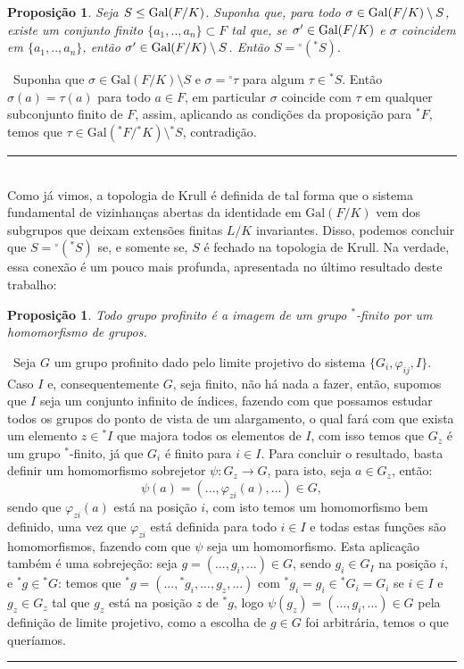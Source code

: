 \documentclass[12pt,a4paper]{article}
\newtheorem{prop}[mydef]{Proposição}
\def\dem{\par\smallbreak\noindent {\textit{ Demonstração:}} \ }
\def\eop{\hfill\rule{2.5mm}{2.5mm} \\ }
\theoremstyle{definition}
\begin{document}
\begin{prop}
    
    Seja $S\leq  \text{\upshape Gal\itshape}({F}/{K})$. Suponha que, para todo $\sigma \in  \text{\upshape Gal\itshape}({F}/{K}) \setminus S$, existe um conjunto finito $\{a_1,..,a_n\}\subset F$ tal que, se $\sigma'\in \text{\upshape Gal\itshape}({F}/{K})$ e $\sigma$ coincidem em $\{a_1,..,a_n\}$, então $\sigma'\in \text{\upshape Gal\itshape}({F}/{K}) \setminus S$. Então $S={^\circ({^*S})}$.
    
\end{prop}

\dem Suponha que $\sigma \in \text{Gal}(F/K)\setminus S$ e $\sigma = {^\circ \tau}$ para algum $\tau\in {^*S}$. Então $\sigma(a)=\tau(a)$ para todo $a\in F$, em particular $\sigma$ coincide com $\tau$ em qualquer subconjunto finito de $F$, assim, aplicando as condições da proposição para $^*F$, temos que $\tau \in \text{Gal}({^*F}/{^*K})\setminus {^*S}$, contradição. \eop

Como já vimos, a topologia de Krull é definida de tal forma que o sistema fundamental de vizinhanças abertas da identidade em $\text{Gal}(F/K)$ vem dos subgrupos que deixam extensões finitas $L/K$ invariantes. Disso, podemos concluir que $S={^\circ({^*S})}$ se, e somente se, $S$ é fechado na topologia de Krull. Na verdade, essa conexão é um pouco mais profunda, apresentada no último resultado deste trabalho:

\begin{prop}
    
    Todo grupo profinito é a imagem de um grupo $^*$-finito por um homomorfismo de grupos.
    
\end{prop}

\dem Seja $G$ um grupo profinito dado pelo limite projetivo do sistema $\{ G_i , \varphi _{ij} , I \}$. Caso $I$ e, consequentemente $G$, seja finito, não há nada a fazer, então, supomos que $I$ seja um conjunto infinito de índices, fazendo com que possamos estudar todos os grupos do ponto de vista de um alargamento, o qual fará com que exista um elemento $z\in {^*I}$ que majora todos os elementos de $I$, com isso temos que $G_z$ é um grupo $^*$-finito, já que $G_i$ é finito para $i\in I$. Para concluir o resultado, basta definir um homomorfismo sobrejetor $\psi:G_z\rightarrow G$, para isto, seja $a\in G_z$, então: $$\psi(a)=(... , \varphi_{zi}(a) , ...)\in G,$$ sendo que $\varphi_{zi}(a)$ está na posição $i$, com isto temos um homomorfismo bem definido, uma vez que $\varphi_{zi}$ está definida para todo $i\in I$ e todas estas funções são homomorfismos, fazendo com que $\psi$ seja um homomorfismo. Esta aplicação também é uma sobrejeção: seja $g=(... , g_i , ...)\in G$, sendo $g_i\in G_I$ na posição $i$, e $^*g\in {^*G}$: temos que $^*g=(... , {^*g_i} , ... , g_z , ...)$ com ${^*g_i}=g_i\in {^*G_i}=G_i$ se $i\in I$ e $g_z\in G_z$ tal que $g_z$ está na posição $z$ de $^*g$, logo $\psi(g_z)=(... , g_i , ...)\in G$ pela definição de limite projetivo, como a escolha de $g\in G$ foi arbitrária, temos o que queríamos. \eop 
\end{document}
